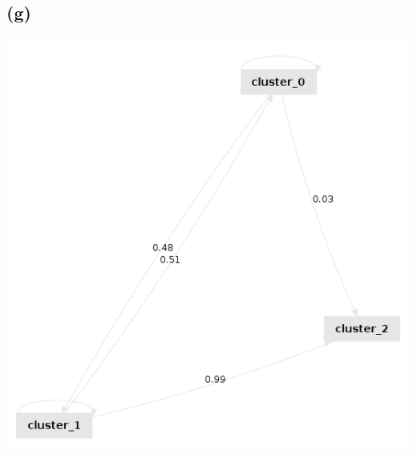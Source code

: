 \documentclass[../../main.tex]{subfiles}
\begin{document}
\subsection*{(g)}
\includegraphics[width=\columnwidth]{img/RapidMiner_g_Graph.png}
\end{document}
